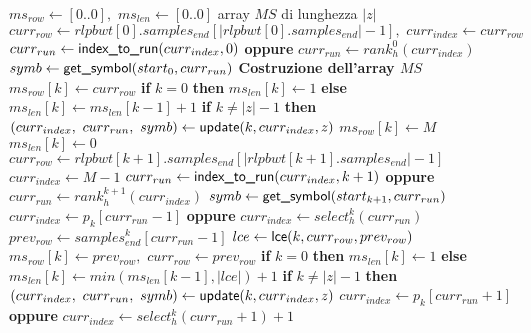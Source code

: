 \begin{algorithm}
  \scriptsize
  \begin{algorithmic}[1]
    \State $ms_{row}\gets [0..0],\,\,ms_{len}\gets [0..0]$
    \Comment array $MS$ di lunghezza $|z|$
    \State $curr_{row}\gets
    rlpbwt[0].samples_{end}[|rlpbwt[0].samples_{end}|-1],\,\,curr_{index}\gets
    curr_{row}$ 
    \State $curr_{run}\gets \mbox{\rm {\sf index\_to\_run}}(curr_{index},0)$ \textbf{oppure}
    $curr_{run}\gets rank_h^0(curr_{index})$  
    \State $symb\gets \mbox{\rm {\sf get\_symbol}}(start_0, curr_{run})$
    \Comment \textbf{Costruzione dell'array $MS$}
    \For {\textit{every} $k\in[0, |z|)$}
    \State $ms_{row}[k]\gets curr_{row}$
    \State \textbf{if} $k=0$ \textbf{then} $ms_{len}[k] \gets 1$ \textbf{else}
    $ms_{len}[k] \gets ms_{len}[k-1]+1$
    \State \hspace{-1.1mm}\textbf{if} $k\neq |z|-1$ \textbf{then}
    $(curr_{index},\,\,curr_{run},\,\,symb)\gets \mbox{\rm {\sf update}}(k, curr_{index},z)$ 
    \Else
    \State $ms_{row}[k]\gets M$
    \State $ms_{len}[k]\gets 0$
    \State $curr_{row}\gets
    rlpbwt[k+1].samples_{end}[|rlpbwt[k+1].samples_{end}|-1]$
    \State $curr_{index}\gets M-1$
    \State $curr_{run}\gets \mbox{\rm {\sf index\_to\_run}}(curr_{index},k+1)$ \textbf{oppure}
    $curr_{run}\gets rank_h^{k+1}(curr_{index})$
    \State $symb\gets \mbox{\rm {\sf get\_symbol}}(start_{k+1}, curr_{run})$
    \EndIf
    \Else
    \State $curr_{index}\gets p_k[curr_{run}-1]$ \textbf{oppure}
    $curr_{index}\gets select_h^k(curr_{run})$
    \State $prev_{row}\gets
    samples_{end}^k[curr_{run}-1]$ 
    \State $lce\gets \mbox{\rm {\sf lce}}(k, curr_{row}, prev_{row})$
    \State $ms_{row}[k]\gets prev_{row},\,\,curr_{row}\gets prev_{row}$
    \State \textbf{if} $k=0$ \textbf{then} $ms_{len}[k] \gets 1$ \textbf{else}
    $ms_{len}[k] \gets min(ms_{len}[k-1], |lce|)+1$ 
    \State \textbf{if} $k\neq |z|-1$ \textbf{then}
    $(curr_{index},\,\,curr_{run},\,\,symb)\gets \mbox{\rm {\sf update}}(k, curr_{index},z)$  
    \State $curr_{index}\gets p_k[curr_{run}+1]$ \textbf{oppure}
    $curr_{index}\gets select_h^k(curr_{run}+1)+1$

\end{algorithmic}
\end{algorithm}
